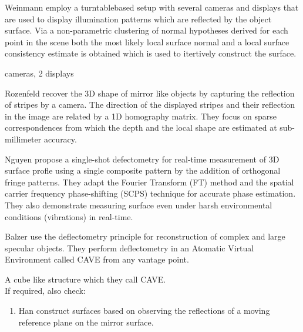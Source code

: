\dagg Weinmann \etal \cite{weinmann2013multi} employ a turntablebased setup with several cameras and displays that are used to display illumination patterns which are reflected by the object surface. Via a non-parametric clustering of normal hypotheses derived for each point in the scene both the most likely local surface normal and a local surface consistency estimate is obtained which is used to itertively construct the surface.

 cameras, 2 displays

\dagg Rozenfeld \etal \cite{rozenfeld2010dense} recover the 3D shape of mirror like objects by capturing the reflection of stripes by a camera. The direction of the displayed stripes and their reflection in the image are related by a 1D homography matrix. They focus on sparse correspondences from which the depth and the local shape are estimated at sub-millimeter accuracy.

\dagg Nguyen \etal \cite{nguyen2019single} propose a single-shot defectometry for real-time measurement of 3D surface profle using a single composite pattern by the addition of orthogonal fringe patterns. They adapt the Fourier Transform (FT) method and the spatial carrier frequency phase-shifting (SCPS) technique for accurate phase estimation. They also demonstrate measuring surface even under harsh environmental conditions (vibrations)
in real-time.

\dagg Balzer \etal \cite{balzer2014cavlectometry} use the deflectometry principle for reconstruction of complex and large specular objects. They perform deflectometry in an Atomatic Virtual Environment called CAVE from any vantage point.

\hardware A cube like structure which they call CAVE. \\

If required, also check:

\begin{enumerate}
	\item \dagg Han \etal \cite{han2016mirror} construct surfaces based on observing the reflections of a moving reference plane on the mirror surface.
\end{enumerate}